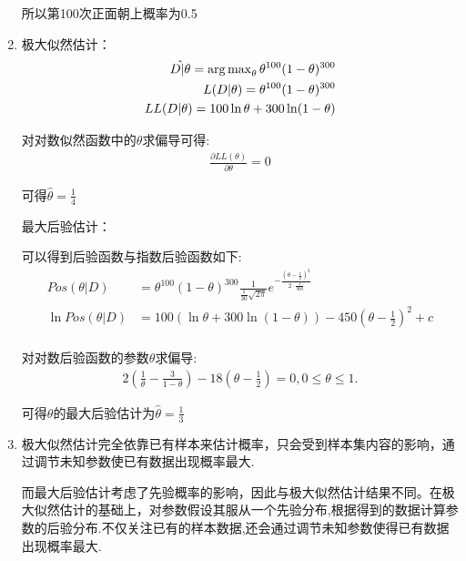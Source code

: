 \documentclass[answers]{exam}  %
\begin{document}
\begin{questions}
\begin{solution}
\begin{enumerate}
			      所以第100次正面朝上概率为0.5
			\item 极大似然估计：
			      \begin{align*}
				      \hat{D|\theta}=\operatorname{arg\,max}\limits_{\theta}\theta^{100}(1-\theta)^{300} \\
				      L(D|\theta)=\theta^{100}(1-\theta)^{300}                           \\
				      LL(D|\theta)=100\ln\theta+300\ln(1-\theta)                         \\
			      \end{align*}

			      对对数似然函数中的$\theta$求偏导可得:
			      \begin{align*}
				      \frac{\partial LL(\theta)}{\partial \theta}=0
			      \end{align*}

			      可得$\hat{\theta}=\frac{1}{4}$

			      最大后验估计：

			      可以得到后验函数与指数后验函数如下:
			      \begin{align*}
				      Pos(\theta|D)     & =\theta^{100}(1-\theta)^{300}\frac{1}{\frac{1}{30}\sqrt{2\pi}}e^{-\frac{(\theta-\frac{1}{2})^2}{2\cdot\frac{1}{900}}} \\
				      \ln Pos(\theta|D) & =100(\ln \theta+300\ln (1-\theta))-450(\theta-\frac{1}{2} )^2+c                                                       \\
			      \end{align*}

			      对对数后验函数的参数$\theta$求偏导:
			      \begin{align*}
				      2(\frac{1}{\theta} -\frac{3}{1-\theta} )-18(\theta-\frac{1}{2} )=0,0\leq \theta\leq 1.
			      \end{align*}

			      可得$\theta$的最大后验估计为$\hat{\theta}=\frac{1}{3}$
			\item 极大似然估计完全依靠已有样本来估计概率，只会受到样本集内容的影响，通过调节未知参数使已有数据出现概率最大.

			      而最大后验估计考虑了先验概率的影响，因此与极大似然估计结果不同。在极大似然估计的基础上，对参数假设其服从一个先验分布,根据得到的数据计算参数的后验分布.不仅关注已有的样本数据,还会通过调节未知参数使得已有数据出现概率最大.
		\end{enumerate}
	\end{solution}



\end{questions}
\end{document}
